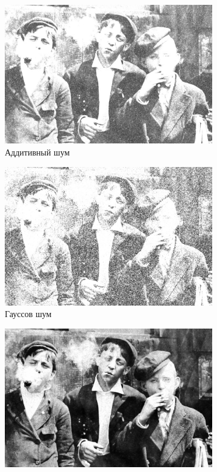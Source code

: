 \begin{figure}[ht]
\begin{subfigure}[b]{0.5\linewidth}
      \includegraphics[width=0.95\linewidth]{../Rang_Filter/Rang_Additive_noise_(k=3,r=9).jpg} 
      \caption{Аддитивный шум} 
      \label{rang_3_9:c} 
      \vspace{4ex}
    \end{subfigure}%
    \begin{subfigure}[b]{0.5\linewidth}
      \centering
      \includegraphics[width=0.95\linewidth]{../Rang_Filter/Rang_Gaussian_noise_(k=3,r=9).jpg} 
      \caption{Гауссов шум} 
      \label{rang_3_9:d} 
      \vspace{4ex}
    \end{subfigure}
    \begin{subfigure}[b]{0.5\linewidth}
      \centering
      \includegraphics[width=0.95\linewidth]{../Rang_Filter/Rang_Poisson_noise_(k=3,r=9).jpg} 

\end{subfigure}
\end{figure}
